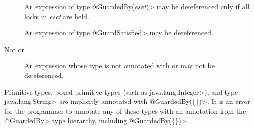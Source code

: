 
\begin{description}

\item[]
  An expression of type \<@GuardedBy(\emph{eset})> may be dereferenced only
  if all locks in \emph{eset} are held.

\item[]
  An expression of type \<@GuardSatisfied> may be dereferenced.

\item[Not  or ]
  An expression whose type is not annotated with  or
   may not be dereferenced.

\end{description}


Primitive types, boxed primitive types (such as \<java.lang.Integer>), and type \<java.lang.String>
are implicitly annotated with \<@GuardedBy(\{\})>.
It is an error for the programmer to annotate any of these types with an annotation from
the \<@GuardedBy> type hierarchy, including \<@GuardedBy(\{\})>.



